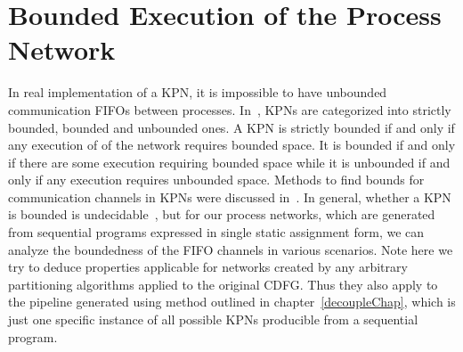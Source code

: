 \section{Bounded Execution of the Process Network}
In real implementation of a KPN, 
it is impossible to have unbounded communication FIFOs between
processes. In~\cite{}, KPNs are 
categorized into strictly bounded, bounded and unbounded ones.
A KPN is strictly bounded if and only if any execution of of the network requires bounded space. It is bounded if and only if there are some
execution requiring bounded space while it is unbounded if and only if any
execution requires unbounded space. Methods to find bounds for communication channels
in KPNs were discussed in~\cite{}\cite{}. In general, whether a
KPN is bounded is undecidable~\cite{}, but for our process networks, which
are generated from sequential programs expressed in single static assignment
form, we can analyze the boundedness of the FIFO channels in various
scenarios. Note here we try to deduce properties applicable for
networks created by any arbitrary partitioning algorithms applied to
the original CDFG. Thus they also apply to the pipeline generated
using method outlined in chapter~\ref{decoupleChap}, which is just
one specific instance of all possible KPNs producible from a sequential program.


